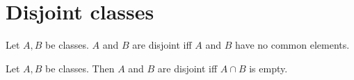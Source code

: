 \documentclass[../set-theory.tex]{subfiles}
\begin{document}
  \section{Disjoint classes}

  \begin{forthel}
    \begin{definition}
      Let $A, B$ be classes.
      $A$ and $B$ are disjoint iff $A$ and $B$ have no common elements.
    \end{definition}
  \end{forthel}

  \begin{forthel}
    \begin{proposition}
      Let $A, B$ be classes.
      Then $A$ and $B$ are disjoint iff $A \cap B$ is empty.
    \end{proposition}
  \end{forthel}
\end{document}
